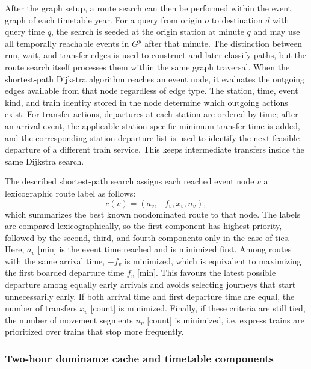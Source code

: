 \documentclass[preprint,12pt]{elsarticle}
\begin{document}
After the graph setup, a route search can then be performed within the event graph of each timetable year. For a query from origin $o$ to destination $d$ with query time $q$, the search is seeded at the origin station at minute $q$ and may use all temporally reachable events in $G^y$ after that minute. The distinction between run, wait, and transfer edges is used to construct and later classify paths, but the route search itself processes them within the same graph traversal. When the shortest-path Dijkstra algorithm reaches an event node, it evaluates the outgoing edges available from that node regardless of edge type. The station, time, event kind, and train identity stored in the node determine which outgoing actions exist. For transfer actions, departures at each station are ordered by time; after an arrival event, the applicable station-specific minimum transfer time is added, and the corresponding station departure list is used to identify the next feasible departure of a different train service. This keeps intermediate transfers inside the same Dijkstra search.

The described shortest-path search assigns each reached event node $v$ a lexicographic route label as follows:
\begin{equation}
  c(v)=\left(a_v,-f_v,x_v,n_v\right),
  \label{eq:lexicographic-label}
\end{equation}
which summarizes the best known nondominated route to that node. The labels are compared lexicographically, so the first component has highest priority, followed by the second, third, and fourth components only in the case of ties. Here, $a_v$ [min] is the event time reached and is minimized first. Among routes with the same arrival time, $-f_v$ is minimized, which is equivalent to maximizing the first boarded departure time $f_v$ [min]. This favours the latest possible departure among equally early arrivals and avoids selecting journeys that start unnecessarily early. If both arrival time and first departure time are equal, the number of transfers $x_v$ [count] is minimized. Finally, if these criteria are still tied, the number of movement segments $n_v$ [count] is minimized, i.e. express trains are prioritized over trains that stop more frequently.

\subsubsection{Two-hour dominance cache and timetable components}\label{sec:methods-part1-cache}
\end{document}
